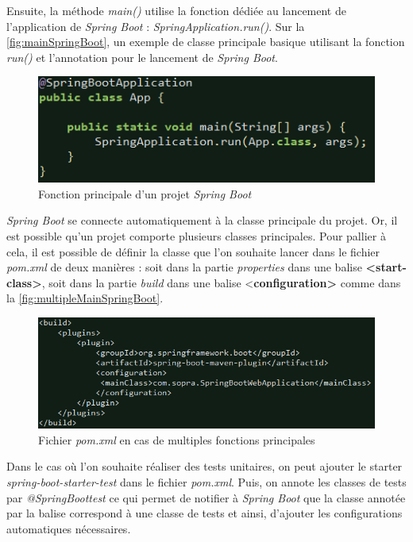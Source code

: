 \documentclass{polytech/polytech}
\begin{document}
Ensuite, la méthode \textit{main()} utilise la fonction dédiée au lancement de l’application de \textit{Spring Boot} : \textit{SpringApplication.run()}. Sur la \autoref{fig:mainSpringBoot}, un exemple de classe principale basique utilisant la fonction \textit{run()} et l’annotation pour le lancement de \textit{Spring Boot}.

\begin{figure}
	\includegraphics[scale=1]{images/mainSpringBoot}
	\caption{Fonction principale d'un projet \textit{Spring Boot}}
	\label{fig:mainSpringBoot}
\end{figure}

\textit{Spring Boot} se connecte automatiquement à la classe principale du projet. Or, il est possible qu’un projet comporte plusieurs classes principales. Pour pallier à cela, il est possible de définir la classe que l’on souhaite lancer dans le fichier \textit{pom.xml} de deux manières : soit dans la partie \textit{properties} dans une balise \textbf{<start-class>}, soit dans la partie \textit{build} dans une balise <\textbf{configuration>} comme dans la  \autoref{fig:multipleMainSpringBoot}.

\begin{figure}
	\includegraphics[scale=0.8]{images/multipleMain}
	\caption{Fichier \textit{pom.xml} en cas de multiples fonctions principales}
	\label{fig:multipleMainSpringBoot}
\end{figure}

Dans le cas où l'on souhaite réaliser des tests unitaires, on peut ajouter le starter \textit{spring-boot-starter-test} dans le fichier \textit{pom.xml}. Puis, on annote les classes de tests par \textit{@SpringBoottest} ce qui permet de notifier à \textit{Spring Boot} que la classe annotée par la balise correspond à une classe de tests et ainsi, d'ajouter les configurations automatiques nécessaires.
\end{document}
